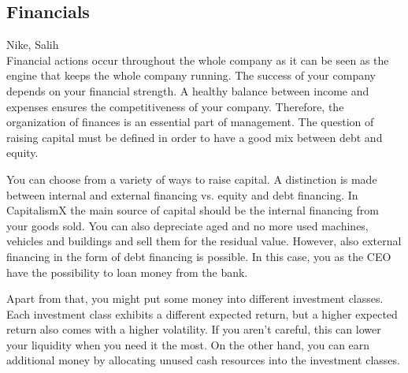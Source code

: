 \subsection{Financials} \label{finance_manual}
Nike, Salih\\

Financial actions occur throughout the whole company as it can be seen as the engine that keeps the whole company running. The success of your company depends on your financial strength. A healthy balance between income and expenses ensures the competitiveness of your company. Therefore, the organization of finances is an essential part of management. The question of raising capital must be defined in order to have a good mix between debt and equity.

You can choose from a variety of ways to raise capital. A distinction is made between internal and external financing vs. equity and debt financing.
In CapitalismX the main source of capital should be the internal financing from your goods sold. You can also depreciate aged and no more used machines, vehicles and buildings and sell them for the residual value. However, also external financing in the form of debt financing is possible. In this case, you as the CEO have the possibility to loan money from the bank.

Apart from that, you might put some money into different investment classes. Each investment class exhibits a different expected return, but a higher expected return also comes with a higher volatility. If you aren't careful, this can lower your liquidity when you need it the most. On the other hand, you can earn additional money by allocating unused cash resources into the investment classes.

